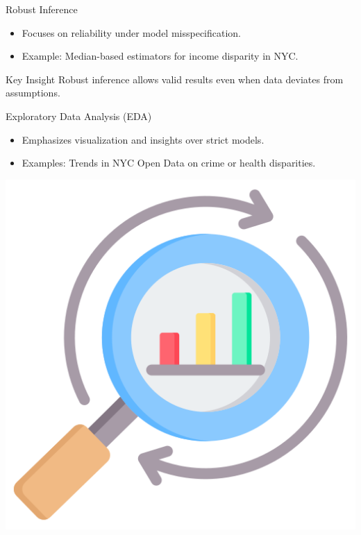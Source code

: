 \documentclass{beamer}
\begin{document}
\begin{frame}{Robust Inference}
\begin{itemize}
    \item Focuses on reliability under model misspecification.
    \item Example: Median-based estimators for income disparity in NYC.
\end{itemize}

\begin{block}{Key Insight}
Robust inference allows valid results even when data deviates from assumptions.
\end{block}
\end{frame}

\begin{frame}{Exploratory Data Analysis (EDA)}
\begin{itemize}
    \item Emphasizes visualization and insights over strict models.
    \item Examples: Trends in NYC Open Data on crime or health disparities.
\end{itemize}

\includegraphics[width=\textwidth]{example-plot.png} %
\end{frame}
\end{document}
